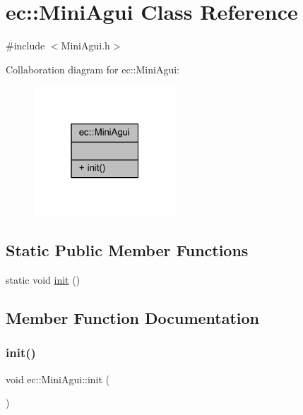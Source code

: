 \hypertarget{classec_1_1_mini_agui}{}\section{ec\+:\+:Mini\+Agui Class Reference}
\label{classec_1_1_mini_agui}


{\ttfamily \#include $<$Mini\+Agui.\+h$>$}



Collaboration diagram for ec\+:\+:Mini\+Agui\+:\nopagebreak
\begin{figure}[H]
\begin{center}
\leavevmode
\includegraphics[width=151pt]{classec_1_1_mini_agui__coll__graph}
\end{center}
\end{figure}
\subsection*{Static Public Member Functions}
\begin{DoxyCompactItemize}
\item 
static void \mbox{\hyperlink{classec_1_1_mini_agui_a11088e28de47294609548327815499b0}{init}} ()
\end{DoxyCompactItemize}


\subsection{Member Function Documentation}
\mbox{\label{classec_1_1_mini_agui_a11088e28de47294609548327815499b0}} 
\subsubsection{\texorpdfstring{init()}{init()}}
{\footnotesize\ttfamily void ec\+::\+Mini\+Agui\+::init (\begin{DoxyParamCaption}{ }\end{DoxyParamCaption})\hspace{0.3cm}{\ttfamily [static]}}



